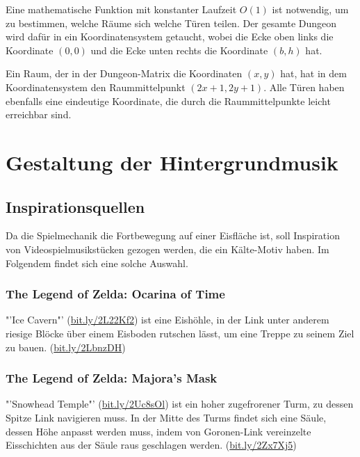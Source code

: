 \documentclass[a4paper,10pt,ngerman]{scrartcl}
\begin{document}
			Eine mathematische Funktion mit konstanter Laufzeit \( O(1) \) ist notwendig, um zu bestimmen, welche Räume sich welche Türen teilen. Der gesamte Dungeon wird dafür in ein Koordinatensystem getaucht, wobei die Ecke oben links die Koordinate \( (0,0) \) und die Ecke unten rechts die Koordinate \( (b,h) \) hat.
			
			Ein Raum, der in der Dungeon-Matrix die Koordinaten \( (x,y) \) hat, hat in dem Koordinatensystem den Raummittelpunkt \( (2x+1,2y+1) \). Alle Türen haben ebenfalls eine eindeutige Koordinate, die durch die Raummittelpunkte leicht erreichbar sind.
			
			
			

	\newpage
	\section{Gestaltung der Hintergrundmusik}
	
		\subsection{Inspirationsquellen}
		
			Da die Spielmechanik die Fortbewegung auf einer Eisfläche ist, soll Inspiration von Videospielmusikstücken gezogen werden, die ein Kälte-Motiv haben. Im Folgendem findet sich eine solche Auswahl.
			
			\subsubsection{The Legend of Zelda: Ocarina of Time}
			
				"'Ice Cavern"' (\href{https://youtube.com/watch?v=bcXuwXKsqMY}{bit.ly/2L22Kf2}) ist eine Eishöhle, in der Link unter anderem riesige Blöcke über einem Eisboden rutschen lässt, um eine Treppe zu seinem Ziel zu bauen. (\href{https://youtube.com/watch?v=uaGb3PtSPDg}{bit.ly/2LbnzDH})
			
			
			\subsubsection{The Legend of Zelda: Majora's Mask}
			
				"'Snowhead Temple"' (\href{https://youtube.com/watch?v=uxPDVDpbskI}{bit.ly/2Uc8sOl}) ist ein hoher zugefrorener Turm, zu dessen Spitze Link navigieren muss. In der Mitte des Turms findet sich eine Säule, dessen Höhe anpasst werden muss, indem von Goronen-Link vereinzelte Eisschichten aus der Säule raus geschlagen werden. (\href{https://youtube.com/watch?v=yM8440G32gk}{bit.ly/2Zx7Xj5})
			
\end{document}
